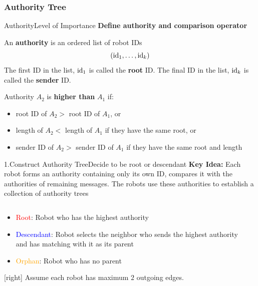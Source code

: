 \documentclass[10pt]{beamer}
\begin{document}
\subsubsection[Algorithm: Authority]{Authority Tree}
\begin{frame}{Authority}{Level of Importance}
  \textbf{Define authority and comparison operator}
  \begin{definition}
    \small{An \textbf{authority} is an ordered list of robot IDs
      $$({\rm id}_1, \ldots, {\rm id}_k)$$
      The first ID in the list, ${\rm id}_1$ is called the \textbf{root} ID.
      The final ID in the list, ${\rm id}_k$ is called the \textbf{sender} ID.}
  \end{definition}
  \begin{definition}
    \small{Authority $A_2$ is \textbf{higher than} $A_1$ if:}
    \begin{itemize}
    \item \small{root ID of $A_2 >$ root ID of $A_1$, or}
    \item \small{length of $A_2 <$  length of $A_1$ if they have the same root, or}
    \item \small{sender ID of $A_2 >$ sender ID of $A_1$ if they have the same root and length}
    \end{itemize}
  \end{definition}
\end{frame}
\begin{frame}{1.Construct Authority Tree}{Decide to be root or descendant}
  \textbf{Key Idea:} Each robot forms an authority containing only its
  own ID, compares it with the authorities of remaining messages. The
  robots use these authorities to establish a collection of authority
  trees
  \begin{columns}[T] %
    \begin{column}{.45\textwidth}
      \begin{itemize}
      \item {\textcolor{red}{Root}: Robot who has the highest authority}
      \item {\textcolor{blue}{Descendant}: Robot selects the neighbor who sends
          the highest authority and has matching with it as its parent}
      \item {\textcolor{orange}{Orphan}: Robot who has no parent}
      \end{itemize}  
      \footnotesize{[right] Assume each robot has maximum $2$ outgoing
        edges.}
    \end{column}%
    \begin{column}{.5\textwidth}
       
    \end{column}
  \end{columns}
\end{frame}
\end{document}

